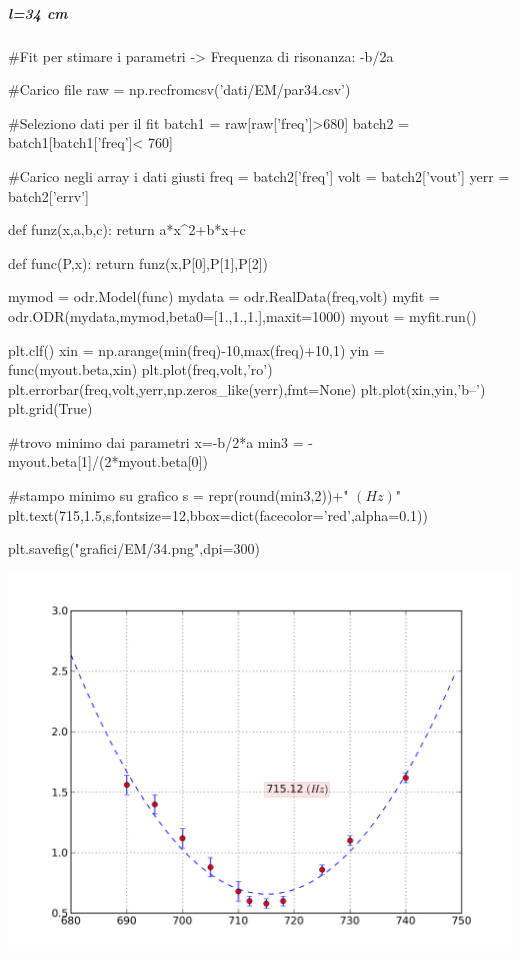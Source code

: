 \subparagraph*{l=34 cm}

\begin{sagesilent}
 #Fit per stimare i parametri -> Frequenza di risonanza: -b/2a

#Carico file
raw = np.recfromcsv('dati/EM/par34.csv')

#Seleziono dati per il fit
batch1 = raw[raw['freq']>680]
batch2 = batch1[batch1['freq']< 760]

#Carico negli array i dati giusti
freq = batch2['freq']
volt = batch2['vout']
yerr = batch2['errv']


def funz(x,a,b,c):
    return a*x^2+b*x+c

def func(P,x):
    return funz(x,P[0],P[1],P[2])

mymod = odr.Model(func)
mydata = odr.RealData(freq,volt)
myfit = odr.ODR(mydata,mymod,beta0=[1.,1.,1.],maxit=1000)
myout = myfit.run()

plt.clf()
xin = np.arange(min(freq)-10,max(freq)+10,1)
yin = func(myout.beta,xin)
plt.plot(freq,volt,'ro')
plt.errorbar(freq,volt,yerr,np.zeros_like(yerr),fmt=None)
plt.plot(xin,yin,'b--')
plt.grid(True)

#trovo minimo dai parametri x=-b/2*a
min3 = -myout.beta[1]/(2*myout.beta[0])


#stampo minimo su grafico
s = repr(round(min3,2))+" $(Hz)$"
plt.text(715,1.5,s,fontsize=12,bbox=dict(facecolor='red',alpha=0.1))

plt.savefig("grafici/EM/34.png",dpi=300)
\end{sagesilent}

\includegraphics[scale=0.75]{grafici/EM/34.png}

